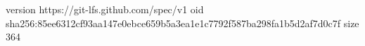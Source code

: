 version https://git-lfs.github.com/spec/v1
oid sha256:85ee6312cf93aa147e0ebce659b5a3ea1e1c7792f587ba298fa1b5d2af7d0c7f
size 364

